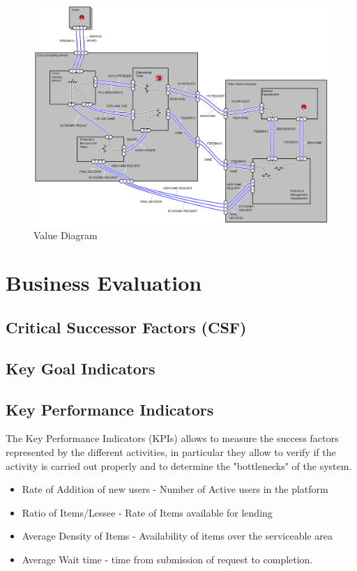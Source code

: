 \documentclass[a4paper,12pt]{report}
\begin{document}
\begin{figure}[H]
 \centering
\includegraphics[scale=0.45]{value_model}
\caption{Value Diagram}
\label{Value Diagramn }
\end{figure} 

\chapter{Business Evaluation}
\section{Critical Successor Factors (CSF)}
\section{Key Goal Indicators}
\section{Key Performance Indicators}
The Key Performance Indicators (KPIs) allows to measure the success factors represented by the
different activities, in particular they allow to verify if the activity is carried out properly and to
determine the "bottlenecks" of the system.
\begin{itemize}
\item{Rate of Addition of new users - Number of Active users in the platform}
\item{ Ratio of Items/Lessee - Rate of Items available for lending}
\item{Average Density of Items - Availability of items over the serviceable area}
\item{ Average Wait time - time from submission of request to completion.}

\end{itemize}
\end{document}
